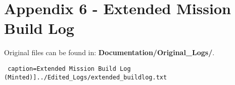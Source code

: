 \documentclass[12pt]{article}
\begin{document}
\section*{Appendix 6 - Extended Mission Build Log}

Original files can be found in: \textbf{Documentation/Original\_Logs/}.

\texttt{ caption=Extended Mission Build Log (Minted)]{../Edited_Logs/extended_buildlog.txt}}
\end{document}
